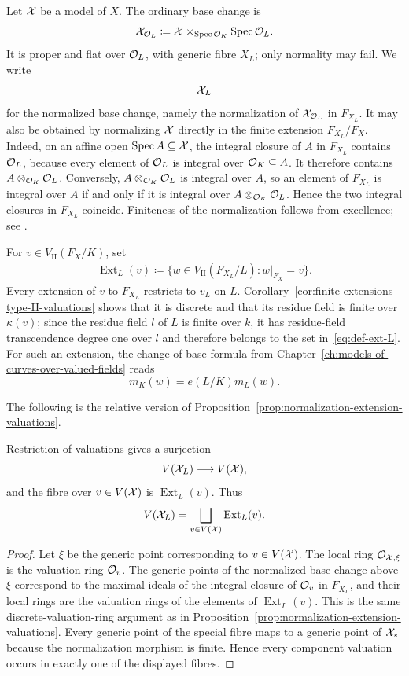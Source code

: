 Let $\mathcal X$ be a model of $X$.
The ordinary base change is
\[
    \mathcal X_{\mathcal O_L}
    \coloneqq
    \mathcal X\times_{\operatorname{Spec}\mathcal O_K}\operatorname{Spec}\mathcal O_L.
\]
It is proper and flat over $\mathcal O_L$, with generic fibre $X_L$; only normality may fail.
We write
\[
    \mathcal X_L
\]
for the normalized base change, namely the normalization of $\mathcal X_{\mathcal O_L}$ in $F_{X_L}$.
It may also be obtained by normalizing $\mathcal X$ directly in the finite extension $F_{X_L}/F_X$.
Indeed, on an affine open $\operatorname{Spec}A\subseteq\mathcal X$, the integral closure of $A$ in $F_{X_L}$ contains $\mathcal O_L$, because every element of $\mathcal O_L$ is integral over $\mathcal O_K\subseteq A$.
It therefore contains $A\otimes_{\mathcal O_K}\mathcal O_L$.
Conversely, $A\otimes_{\mathcal O_K}\mathcal O_L$ is integral over $A$, so an element of $F_{X_L}$ is integral over $A$ if and only if it is integral over $A\otimes_{\mathcal O_K}\mathcal O_L$.
Hence the two integral closures in $F_{X_L}$ coincide.
Finiteness of the normalization follows from excellence; see \cite[Theorem 8.2.39(d)]{Liu}.

For $v\in V_\mathrm{II}(F_X/K)$, set
\begin{align}\label{eq:def-ext-L}
    \operatorname{Ext}_L(v)
    \coloneqq
    \{w\in V_\mathrm{II}(F_{X_L}/L):w|_{F_X}=v\}.
\end{align}
Every extension of $v$ to $F_{X_L}$ restricts to $v_L$ on $L$.
Corollary~\ref{cor:finite-extensions-type-II-valuations} shows that it is discrete and that its residue field is finite over $\kappa(v)$; since the residue field $l$ of $L$ is finite over $k$, it has residue-field transcendence degree one over $l$ and therefore belongs to the set in~\eqref{eq:def-ext-L}.
For such an extension, the change-of-base formula from Chapter~\ref{ch:models-of-curves-over-valued-fields} reads
\[
    m_K(w)=e(L/K)m_L(w).
\]

The following is the relative version of Proposition~\ref{prop:normalization-extension-valuations}.

\begin{proposition}\label{prop:valuations-normalized-base-change}
    Restriction of valuations gives a surjection
    \[
        V(\mathcal X_L)\longrightarrow V(\mathcal X),
    \]
    and the fibre over $v\in V(\mathcal X)$ is $\operatorname{Ext}_L(v)$.
    Thus
    \begin{align}\label{eq:valuations-normalized-base-change}
        V(\mathcal X_L)
        =
        \bigsqcup_{v\in V(\mathcal X)}\operatorname{Ext}_L(v).
    \end{align}
\end{proposition}

\begin{proof}
    Let $\xi$ be the generic point corresponding to $v\in V(\mathcal X)$.
    The local ring $\mathcal{O}_{\mathcal X,\xi}$ is the valuation ring $\mathcal{O}_v$.
    The generic points of the normalized base change above $\xi$ correspond to the maximal ideals of the integral closure of $\mathcal{O}_v$ in $F_{X_L}$, and their local rings are the valuation rings of the elements of $\operatorname{Ext}_L(v)$.
    This is the same discrete-valuation-ring argument as in Proposition~\ref{prop:normalization-extension-valuations}.
    Every generic point of the special fibre maps to a generic point of $\mathcal X_s$ because the normalization morphism is finite.
    Hence every component valuation occurs in exactly one of the displayed fibres.
\end{proof}

